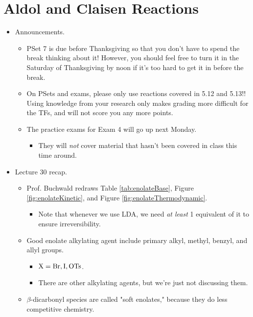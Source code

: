 \documentclass[../notes.tex]{subfiles}
\begin{document}
\section{Aldol and Claisen Reactions}
\begin{itemize}
    \item {}Announcements.
    \begin{itemize}
        \item PSet 7 is due before Thanksgiving so that you don't have to spend the break thinking about it! However, you should feel free to turn it in the Saturday of Thanksgiving by noon if it's too hard to get it in before the break.
        \item On PSets and exams, please only use reactions covered in 5.12 and 5.13!! Using knowledge from your research only makes grading more difficult for the TFs, and will not score you any more points.
        \item The practice exams for Exam 4 will go up next Monday.
        \begin{itemize}
            \item They will \emph{not} cover material that hasn't been covered in class this time around.
        \end{itemize}
    \end{itemize}
    \item Lecture 30 recap.
    \begin{itemize}
        \item Prof. Buchwald redraws Table \ref{tab:enolateBase}, Figure \ref{fig:enolateKinetic}, and Figure \ref{fig:enolateThermodynamic}.
        \begin{itemize}
            \item Note that whenever we use LDA, we need \emph{at least} 1 equivalent of it to ensure irreversibility.
        \end{itemize}
        \item Good enolate alkylating agent include primary alkyl, methyl, benzyl, and allyl groups.
        \begin{itemize}
            \item $\ce{X}=\ce{Br},\ce{I},\ce{OTs}$.
            \item There are other alkylating agents, but we're just not discussing them.
        \end{itemize}
        \item $\beta$-dicarbonyl species are called "soft enolates," because they do less competitive chemistry.
    \end{itemize}

\end{itemize}
\end{document}
